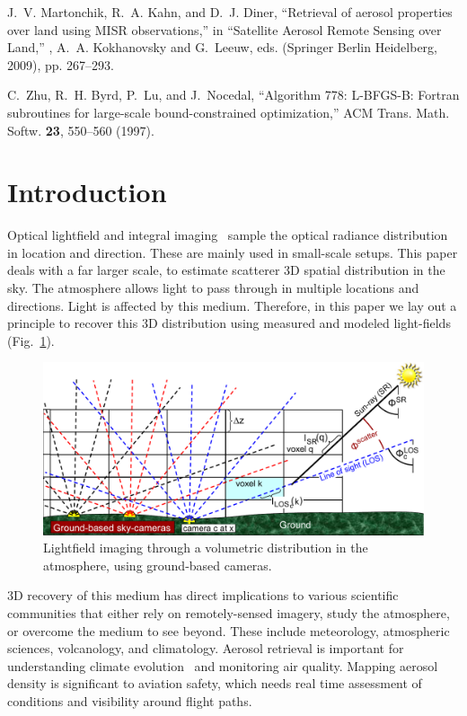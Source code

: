 \documentclass[10pt,letterpaper]{article}
\newcommand{\yoavcomment}[1]{}
\renewcommand{\yoavcomment}[1]{#1} %
\begin{document}
\begin{thebibliography}{10}
J.~V. Martonchik, R.~A. Kahn, and D.~J. Diner, \enquote{{Retrieval of aerosol
  properties over land using MISR observations},} in \enquote{Satellite Aerosol
  Remote Sensing over Land,} , A.~A. Kokhanovsky and G.~Leeuw, eds. (Springer
  Berlin Heidelberg, 2009), pp. 267--293.

C.~Zhu, R.~H. Byrd, P.~Lu, and J.~Nocedal, \enquote{{Algorithm 778: L-BFGS-B:
  Fortran subroutines for large-scale bound-constrained optimization},} ACM
  Trans. Math. Softw. \textbf{23}, 550--560 (1997).

\end{thebibliography}


\section{Introduction}
\label{sec:intro}

Optical lightfield and integral
imaging~\cite{Stern2006,kim,Ng1948} sample the optical
radiance distribution in location and direction. These are mainly used in
small-scale setups. This paper deals with a far larger scale, to
estimate scatterer 3D spatial distribution in the sky.  The atmosphere
allows light to pass through in multiple locations and
directions. Light is affected by this medium. Therefore, in this paper
we lay out a principle to recover this 3D distribution using measured
and modeled light-fields (Fig.~\ref{fig:groundgrid}).
\begin{figure}[t!]
  \begin{center}
    \yoavcomment{\includegraphics[width=\linewidth]{images/groundtomog24.pdf}}
  \end{center}
  \caption{\small Lightfield imaging through a volumetric distribution
    in the atmosphere, using ground-based cameras.}
  \label{fig:groundgrid}
\end{figure}
3D recovery of this medium has direct implications to various
scientific communities that either rely on remotely-sensed imagery,
study the atmosphere, or overcome the medium to see beyond. These
include meteorology, atmospheric sciences, volcanology, and
climatology.  Aerosol retrieval is important for understanding climate
evolution~\cite{Dayan2008,kalashnikova} and monitoring air
quality. Mapping aerosol density is significant to aviation safety,
which needs real time assessment of conditions and visibility around
flight paths.
\end{document}
